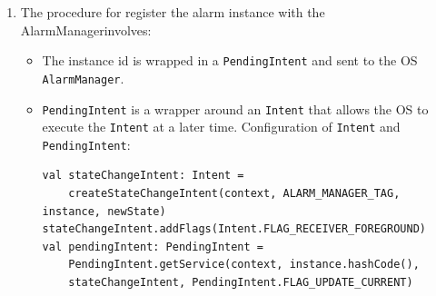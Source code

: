 \documentclass{article}
\begin{document}
\begin{enumerate}
\begin{enumerate}
\begin{itemize}
            There are many states in which an alarm instance can be such as : \texttt{DISMISSED\_STATE}, \texttt{PREDISMISSED\_STATE}, \texttt{MISSED\_STATE}, \texttt{SNOOZED\_STATE}, \texttt{FIRED\_STATE} etc..(as mentioned in \texttt{AlarmInstance.kt}) but these states are mainly required for allowing user to control the alarm - that is, to off or snooze the alarm.

            But the \texttt{MISSED\_STATE} can be useful, because an alarm is in this state if the alarm was not triggered in the first place - that is, the application didn't receive the alarm. 
            A check can be performed on this state and further action can be taken such as rescheduling the alarm or logging the event.

            \item Once the instance is created, with reference to the instance id, this instance is registered via \texttt{registerInstance} method.
        \end{itemize}
\begin{lstlisting}[caption={DeskClock - Setting up an alarm instance},label={label: DeskClock - Setting up an alarm instance}]
    private fun setupAlarmInstance(alarm: Alarm): AlarmInstance {
    var newInstance = alarm.createInstanceAfter(Calendar.getInstance())
    newInstance = AlarmInstance.addInstance(cr, newInstance)
    AlarmStateManager.registerInstance(mAppContext, newInstance, true)
    return newInstance
    }
 \end{lstlisting} 
        \item The procedure for register the alarm instance with the AlarmManagerinvolves:
        \begin{itemize}
            \item The instance id is wrapped in a \texttt{PendingIntent} and sent to the OS \texttt{AlarmManager}.
            \item \texttt{PendingIntent} is a wrapper around an \texttt{Intent} that allows the OS to execute the \texttt{Intent} at a later time. Configuration of \texttt{Intent} and \texttt{PendingIntent}: 

\begin{lstlisting}[caption={DeskClock - PendingIntent which is sent to AlarmManager},label={label: DeskClock - PendingIntent which is sent to AlarmManager}]
val stateChangeIntent: Intent =
    createStateChangeIntent(context, ALARM_MANAGER_TAG, instance, newState)
stateChangeIntent.addFlags(Intent.FLAG_RECEIVER_FOREGROUND)
val pendingIntent: PendingIntent =
    PendingIntent.getService(context, instance.hashCode(),
    stateChangeIntent, PendingIntent.FLAG_UPDATE_CURRENT)
\end{lstlisting} 


\end{itemize}
\end{enumerate}
\end{enumerate}
\end{document}
